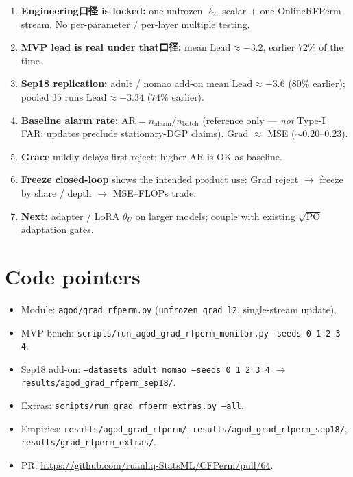 \documentclass[11pt]{article}
\newcommand{\Lead}{\mathrm{Lead}}
\begin{document}
\begin{enumerate}[leftmargin=*,itemsep=0.35em]
  \item \textbf{Engineering口径 is locked:} one unfrozen
        $\ell_2$ scalar + one OnlineRFPerm stream. No
        per-parameter / per-layer multiple testing.
  \item \textbf{MVP lead is real under that口径:}
        mean $\Lead\approx -3.2$, earlier $72\%$ of the time.
  \item \textbf{Sep18 replication:} adult / nomao add-on mean
        $\Lead\approx -3.6$ ($80\%$ earlier); pooled $35$ runs
        $\Lead\approx -3.34$ ($74\%$ earlier).
  \item \textbf{Baseline alarm rate:}
        $\mathrm{AR}=n_{\mathrm{alarm}}/n_{\mathrm{batch}}$
        (reference only --- \emph{not} Type-I FAR; updates preclude
        stationary-DGP claims). Grad $\approx$ MSE ($\sim 0.20$--$0.23$).
  \item \textbf{Grace} mildly delays first reject; higher AR is OK as baseline.
  \item \textbf{Freeze closed-loop} shows the intended product use:
        Grad reject $\to$ freeze by share / depth $\to$ MSE--FLOPs trade.
  \item \textbf{Next:} adapter / LoRA $\theta_U$ on larger models; couple with
        existing $\sqrt{\mathrm{PO}}$ adaptation gates.
\end{enumerate}

\section{Code pointers}
\label{sec:code}

\begin{itemize}[leftmargin=*]
  \item Module: \texttt{agod/grad\_rfperm.py}
        (\texttt{unfrozen\_grad\_l2}, single-stream update).
  \item MVP bench:
        \texttt{scripts/run\_agod\_grad\_rfperm\_monitor.py}
        \texttt{--seeds 0 1 2 3 4}.
  \item Sep18 add-on:
        \texttt{--datasets adult nomao --seeds 0 1 2 3 4}
        $\to$ \texttt{results/agod\_grad\_rfperm\_sep18/}.
  \item Extras:
        \texttt{scripts/run\_grad\_rfperm\_extras.py --all}.
  \item Empirics:
        \texttt{results/agod\_grad\_rfperm/},
        \texttt{results/agod\_grad\_rfperm\_sep18/},
        \texttt{results/grad\_rfperm\_extras/}.
  \item PR:
        \url{https://github.com/ruanhq-StatsML/CFPerm/pull/64}.
\end{itemize}
\end{document}
